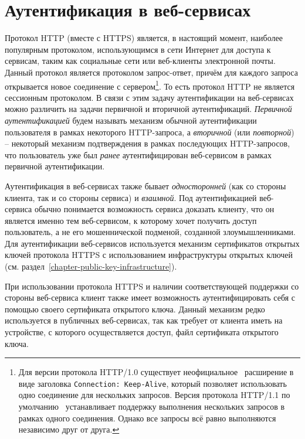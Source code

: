 \section{Аутентификация в веб-сервисах}

Протокол HTTP (вместе с HTTPS) является, в настоящий момент, наиболее популярным протоколом, использующимся в сети Интернет для доступа к сервисам, таким как социальные сети или веб-клиенты электронной почты. Данный протокол является протоколом запрос-ответ, причём для каждого запроса открывается новое соединение с сервером\footnote{Для версии протокола HTTP/1.0 существует неофициальное~\cite[p.~17]{Totty:2002} расширение в виде заголовка \texttt{Connection: Keep-Alive}, который позволяет использовать одно соединение для нескольких запросов. Версия протокола HTTP/1.1 по умолчанию~\cite[6.3.~Persistence]{rfc7230} устанавливает поддержку выполнения нескольких запросов в рамках одного соединения. Однако все запросы всё равно выполняются независимо друг от друга.}. То есть протокол HTTP не является сессионным протоколом. В связи с этим задачу аутентификации на веб-сервисах можно различить на задачи первичной и вторичной аутентификаций. \textit{Первичной аутентификацией} будем называть механизм обычной аутентификации пользователя в рамках некоторого HTTP-запроса, а \textit{вторичной} (или \textit{повторной}) -- некоторый механизм подтверждения в рамках последующих HTTP-запросов, что пользователь уже был \textit{ранее} аутентифицирован веб-сервисом в рамках первичной аутентификации.

Аутентификация в веб-сервисах также бывает \textit{односторонней} (как со стороны клиента, так и со стороны сервиса) и \textit{взаимной}. Под аутентификацией веб-сервиса обычно понимается возможность сервиса доказать клиенту, что он является именно тем веб-сервисом, к которому хочет получить доступ пользователь, а не его мошеннической подменой, созданной злоумышленниками. Для аутентификации веб-сервисов используется механизм сертификатов открытых ключей протокола HTTPS с использованием инфраструктуры открытых ключей (см. раздел~\ref{chapter-public-key-infrastructure}).

При использовании протокола HTTPS и наличии соответствующей поддержки со стороны веб-сервиса клиент также имеет возможность аутентифицировать себя с помощью своего сертификата открытого ключа. Данный механизм редко используется в публичных веб-сервисах, так как требует от клиента иметь на устройстве, с которого осуществляется доступ, файл сертификата открытого ключа.

